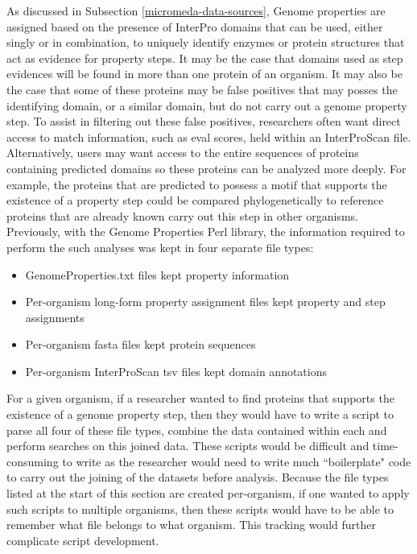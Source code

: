 As discussed in Subsection \ref{micromeda-data-sources}, Genome properties are 
assigned based on the presence of InterPro domains that can be used, either 
singly or in combination, to uniquely identify enzymes or protein structures 
that act as evidence for property steps. It may be the case that domains used as 
step evidences will be found in more than one protein of an organism. It may 
also be the case that some of these proteins may be false positives that may 
posses the identifying domain, or a similar domain, but do not carry out a 
genome property step. To assist in filtering out these false positives, 
researchers often want direct access to match information, such as \gls{eval} 
scores, held within an InterProScan file. Alternatively, users may want access 
to the entire sequences of proteins containing predicted domains so these 
proteins can be analyzed more deeply. For example, the proteins that are 
predicted to possess a motif that supports the existence of a property step 
could be compared phylogenetically to reference proteins that are already known 
carry out this step in other organisms. Previously, with the Genome Properties 
Perl library, the information required to perform the such analyses was kept in 
four separate file types:

\begin{itemize}
\item GenomeProperties.txt files kept property information
\item Per-organism long-form property assignment files kept property and step 
assignments
\item Per-organism \gls{fasta} files \cite{pearson19905} kept protein sequences 
\item  Per-organism InterProScan \gls{tsv} files kept domain annotations 
\end{itemize}

For a given organism, if a researcher wanted to find proteins that supports the 
existence of a genome property step, then they would have to write a script to 
parse all four of these file types, combine the data contained within each and 
perform searches on this joined data. These scripts would be difficult and 
time-consuming to write as the researcher would need to write much 
``boilerplate" code to carry out the joining of the datasets before analysis. 
Because the file types listed at the start of this section are created 
per-organism, if one wanted to apply such scripts to multiple organisms, then 
these scripts would have to be able to remember what file belongs to what 
organism. This tracking would further complicate script development.

